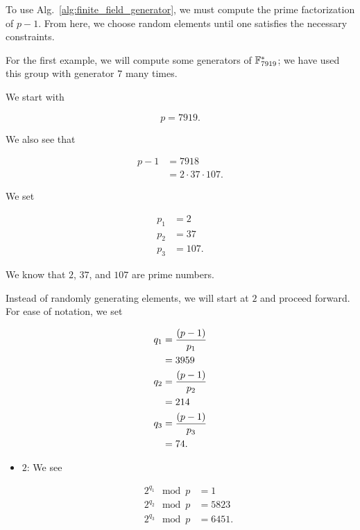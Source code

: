 To use Alg.~\ref{alg:finite_field_generator}, we must compute
the prime factorization of $p-1$.
From here, we choose random elements until one satisfies
the necessary constraints.

\begin{example}
\label{example:app_math_finite_generator_7919}

For the first example, we will compute some generators of $\mathbb{F}_{7919}^{*}$;
we have used this \gls{group} with generator $7$ many times.

We start with

\begin{equation}
    p = 7919.
\end{equation}

\noindent
We also see that

\begin{align}
    p - 1 &= 7918 \nonumber\\
        &= 2\cdot 37\cdot 107.
\end{align}

\noindent
We set

\begin{align}
    p_{1} &= 2 \nonumber\\
    p_{2} &= 37 \nonumber\\
    p_{3} &= 107.
\end{align}

\noindent
We know that $2$, $37$, and $107$ are prime numbers.

Instead of randomly generating elements, we will start at $2$
and proceed forward.
For ease of notation, we set

\begin{align}
    q_{1} &= \frac{\left( p-1 \right)}{p_{1}} \nonumber\\
        &= 3959 \nonumber\\
    q_{2} &= \frac{\left( p-1 \right)}{p_{2}} \nonumber\\
        &= 214 \nonumber\\
    q_{3} &= \frac{\left( p-1 \right)}{p_{3}} \nonumber\\
        &= 74.
\end{align}

\begin{itemize}
\item $2$: We see

\begin{align}
    2^{q_{1}} \mod p &= 1
        \nonumber\\
    2^{q_{2}} \mod p &= 5823
        \nonumber\\
    2^{q_{3}} \mod p &= 6451.
\end{align}


\end{itemize}
\end{example}
